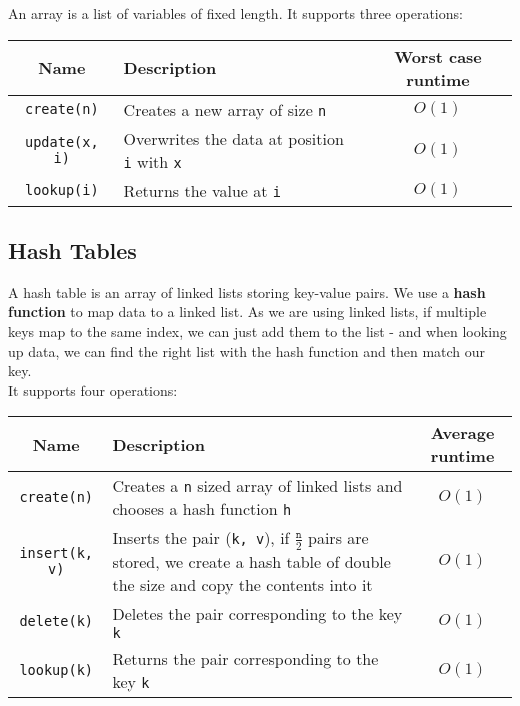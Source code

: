 \documentclass[a4paper, 12pt, twoside]{article}
\begin{document}
An array is a list of variables of fixed length. 
It supports three operations:

\begin{center}
  \begin{tabular}{ || c | p{6.5cm} | c || }
    \hline
    Name & Description & Worst case runtime \\
    \hline
    \texttt{create(n)} & Creates a new array of size \texttt{n} & $O(1)$ \\
    \hline
    \texttt{update(x, i)} & Overwrites the data at position \texttt{i} with \texttt{x} & $O(1)$ \\
    \hline
    \texttt{lookup(i)} & Returns the value at \texttt{i} & $O(1)$ \\
    \hline
  \end{tabular}
\end{center}

\subsection{Hash Tables}

A hash table is an array of linked lists storing key-value pairs. 
We use a \textbf{hash function} to map data to a linked list. As we 
are using linked lists, if multiple keys map to the same index, 
we can just add them to the list - and when looking up data, we 
can find the right list with the hash function and then match our key.
\\[\baselineskip]
It supports four operations:

\begin{center}
  \begin{tabular}{ || c | p{7.5cm} | c || }
    \hline
    Name & Description & Average runtime \\
    \hline
    \texttt{create(n)} & Creates a \texttt{n} sized array
    of linked lists and chooses a hash function \texttt{h} & $O(1)$ \\
    \hline
    \texttt{insert(k, v)} & Inserts the pair (\texttt{k, v}),
    if $\frac{\texttt{n}}{2}$ pairs are stored, we create a hash
    table of double the size and copy the contents into it & $O(1)$ \\
    \hline
    \texttt{delete(k)} & Deletes the pair corresponding to the key \texttt{k} & $O(1)$ \\
    \hline
    \texttt{lookup(k)} & Returns the pair corresponding to the key \texttt{k} & $O(1)$ \\
    \hline
  \end{tabular}
\end{center}
\end{document}

